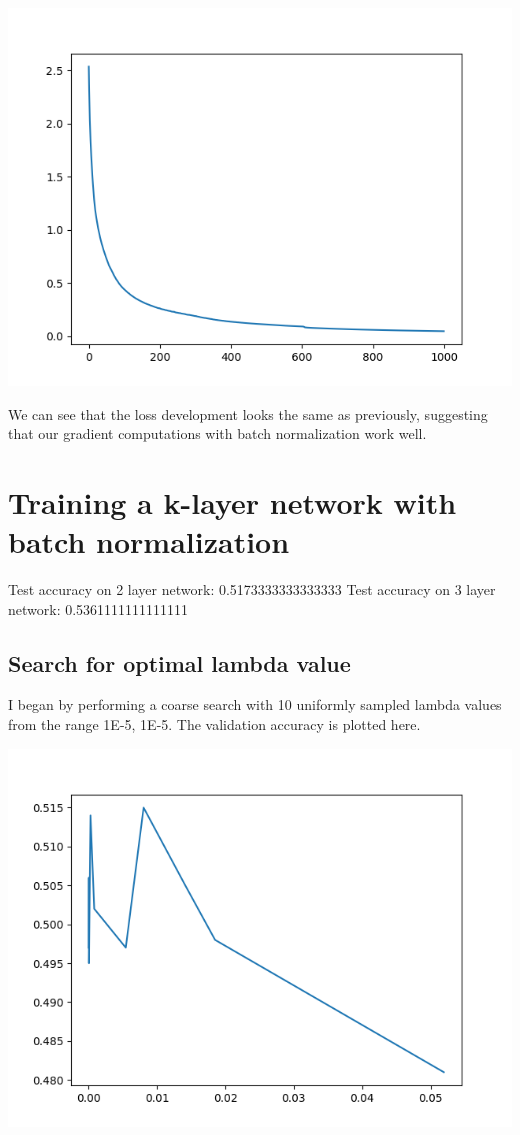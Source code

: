 \documentclass[11pt,a4paper]{article}
\begin{document}
\includegraphics[width=\textwidth]{sanity_check_batch_norm.png}

We can see that the loss development looks the same as previously, suggesting that our gradient computations with batch normalization work well.

\section{Training a k-layer network with batch normalization}

Test accuracy on 2 layer network: 0.5173333333333333
Test accuracy on 3 layer network: 0.5361111111111111

\subsection{Search for optimal lambda value}

I began by performing a coarse search with 10 uniformly sampled lambda values from the range 1E-5, 1E-5. The validation accuracy is plotted here.

\includegraphics[width=\textwidth]{coarse_search.png}
\end{document}
